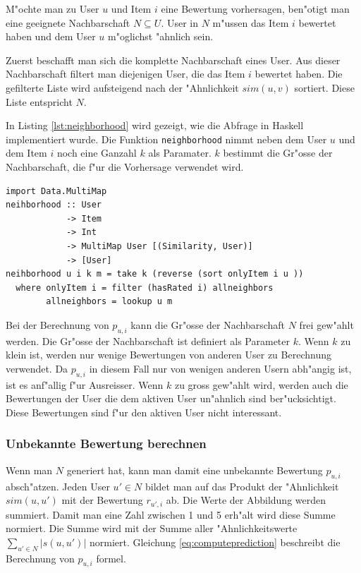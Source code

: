 \documentclass[a4paper, 12pt]{article}
\begin{document}
M"ochte man zu User $u$ und Item $i$ eine Bewertung vorhersagen, ben"otigt man eine geeignete Nachbarschaft $N \subseteq U$. User in $N$ m"ussen das Item $i$ bewertet haben und dem User $u$ m"oglichst "ahnlich sein.

Zuerst beschafft man sich die komplette Nachbarschaft eines User. Aus dieser Nachbarschaft filtert man diejenigen User, die das Item $i$ bewertet haben. Die gefilterte Liste wird aufsteigend nach der "Ahnlichkeit $sim(u,v)$ sortiert. Diese Liste entspricht $N$. 

In Listing \ref{lst:neighborhood} wird gezeigt, wie die Abfrage in Haskell implementiert wurde. Die Funktion \verb|neighborhood| nimmt neben dem User $u$ und dem Item $i$ noch eine Ganzahl $k$ als Paramater. $k$ bestimmt die Gr"osse der Nachbarschaft, die f"ur die Vorhersage verwendet wird.

\begin{lstlisting}[caption=Funktion um die Nachbarschaft f"ur ein User und ein Item zu generieren, label=lst:neighborhood]
import Data.MultiMap
neihborhood :: User
            -> Item
            -> Int
            -> MultiMap User [(Similarity, User)]
            -> [User]
neihborhood u i k m = take k (reverse (sort onlyItem i u ))
  where onlyItem i = filter (hasRated i) allneighbors
        allneighbors = lookup u m
\end{lstlisting}

Bei der Berechnung von $p_{u,i}$ kann die Gr"osse der Nachbarschaft $N$ frei gew"ahlt werden. Die Gr"osse der Nachbarschaft ist definiert als Parameter $k$. Wenn $k$ zu klein ist, werden nur wenige Bewertungen von anderen User zu Berechnung verwendet. Da $p_{u,i}$ in diesem Fall nur von wenigen anderen Usern abh"angig ist, ist es anf"allig f"ur Ausreisser. Wenn $k$ zu gross gew"ahlt wird, werden auch die Bewertungen der User die dem aktiven User un"ahnlich sind ber"ucksichtigt. Diese Bewertungen sind f"ur den aktiven User nicht interessant. 

\subsubsection{Unbekannte Bewertung berechnen}
\label{sec:predict}

Wenn man $N$ generiert hat, kann man damit eine unbekannte Bewertung $p_{u,i}$ absch"atzen. Jeden User $u' \in N$ bildet man auf das Produkt der "Ahnlichkeit $sim(u,u')$ mit der Bewertung $r_{u',i}$ ab. Die Werte der Abbildung werden summiert. Damit man eine Zahl zwischen 1 und 5 erh"alt wird diese Summe normiert. Die Summe wird mit der Summe aller "Ahnlichkeitswerte $\sum_{u' \in N}{|s(u,u')|}$ normiert. Gleichung \ref{eq:computeprediction} beschreibt die Berechnung von $p_{u,i}$ formel.
\end{document}
